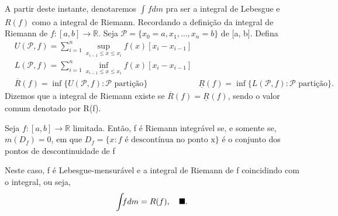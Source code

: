 \documentclass[measure_theory.tex]{subfiles}
\begin{document}
A partir deste instante, denotaremos \(\int_{}f dm\) pra ser a integral de Lebesgue e \(R(f)\) como a integral de Riemann. Recordando a definição da integral de Riemann de \(f:[a, b]\rightarrow \mathbb{R}.\) Seja \(\mathcal{P} = \{x_{0} = a, x_1, \dotsc , x_{n} = b\}\) de [a, b].
Defina
\begin{align*}
	 & U(\mathcal{P}, f) = \sum\limits_{i=1}^{n}\sup_{x_{i-1}\leq x \leq x_{i}}f(x)[x_{i} - x_{i-1}] \\
	 & L(\mathcal{P}, f) = \sum\limits_{i=1}^{n}\inf_{x_{i-1}\leq x \leq x_{i}}f(x)[x_{i} - x_{i-1}] \\
	 & \overline{R}(f) = \inf_{}\{U(\mathcal{P}, f): \mathcal{P} \text{ partição}\}
	 & \underline{R}(f) = \inf_{}\{L(\mathcal{P}, f): \mathcal{P} \text{ partição}\}.
\end{align*}
Dizemos que a integral de Riemann existe se \(\overline{R}(f) = \underline{R}_{}(f)\), sendo o valor comum denotado por R(f).
\begin{theorem*}
	Seja \(f:[a, b]\rightarrow \mathbb{R}\) limitada. Então, f é Riemann integrável se, e somente se, \(m(D_f) = 0\), em que \(D_f = \{x: f \text{ é descontínua no ponto x}\}\) é o conjunto dos pontos
	de descontinuidade de f

	Neste caso, f é Lebesgue-mensurável e a integral de Riemann de f coincidindo com o integral, ou seja,
	\[
		\int_{}f dm = R(f),\quad \text{$\blacksquare$}.
	\]
\end{theorem*}
\end{document}
